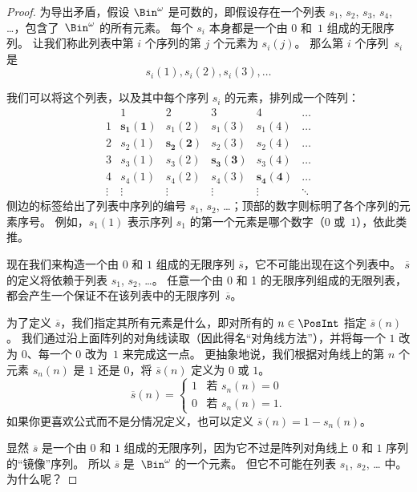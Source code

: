 \documentclass[../../../include/open-logic-section]{subfiles}
\begin{document}
\begin{proof}
为导出矛盾，假设 $\Bin^\omega$ 是可数的，即假设存在一个列表 $s_{1}$, $s_{2}$, $s_{3}$, $s_{4}$, \dots{}，包含了~$\Bin^\omega$ 的所有元素。
每个 $s_i$ 本身都是一个由 $0$ 和~$1$ 组成的无限序列。
让我们称此列表中第 $i$ 个序列的第 $j$ 个元素为 $s_i(j)$。
那么第 $i$ 个序列~$s_i$ 是
\[
s_i(1), s_i(2), s_i(3), \dots
\]

我们可以将这个列表，以及其中每个序列 $s_i$ 的元素，排列成一个阵列：
\[
\begin{array}{c|c|c|c|c|c}
& 1 & 2 & 3 & 4 & \dots \\\hline
1 & \mathbf{s_{1}(1)} & s_{1}(2) & s_{1}(3) & s_1(4) & \dots \\\hline
2 & s_{2}(1)& \mathbf{s_{2}(2)} & s_2(3) & s_2(4) & \dots \\\hline
3 & s_{3}(1)& s_{3}(2) & \mathbf{s_3(3)} & s_3(4) & \dots \\\hline
4 & s_{4}(1)& s_{4}(2) & s_4(3) & \mathbf{s_4(4)} & \dots \\\hline
\vdots & \vdots & \vdots & \vdots & \vdots & \mathbf{\ddots}
\end{array}
\]
侧边的标签给出了列表中序列的编号 $s_1$, $s_2$, \dots；顶部的数字则标明了各个序列的元素序号。
例如，$s_{1}(1)$ 表示序列 $s_{1}$ 的第一个元素是哪个数字（$0$ 或~$1$），依此类推。

现在我们来构造一个由 $0$ 和 $1$ 组成的无限序列 $\overline{s}$，它不可能出现在这个列表中。
$\overline{s}$ 的定义将依赖于列表 $s_1$, $s_2$, \dots。
任意一个由 0 和 1 的无限序列组成的无限列表，都会产生一个保证不在该列表中的无限序列~$\overline{s}$。

为了定义 $\overline{s}$，我们指定其所有元素是什么，即对所有的 $n \in \PosInt$ 指定 $\overline{s}(n)$。
我们通过沿上面阵列的对角线读取（因此得名“对角线方法”），并将每一个 $1$ 改为 $0$、每一个 $0$ 改为~$1$ 来完成这一点。
更抽象地说，我们根据对角线上的第 $n$ 个元素 $s_n(n)$ 是 $1$ 还是 $0$，将 $\overline{s}(n)$ 定义为 $0$ 或 $1$。
\[
\overline{s}(n) =
\begin{cases}
1 & \text{若 $s_{n}(n) = 0$}\\
0 & \text{若 $s_{n}(n) = 1$}.
\end{cases}
\]
如果你更喜欢公式而不是分情况定义，也可以定义 $\overline{s}(n) = 1 - s_n(n)$。

显然 $\overline{s}$ 是一个由 $0$ 和 $1$ 组成的无限序列，因为它不过是阵列对角线上 $0$ 和 $1$ 序列的“镜像”序列。
所以 $\overline{s}$ 是~$\Bin^\omega$ 的一个元素。
但它不可能在列表 $s_1$, $s_2$, \dots{} 中。为什么呢？


\end{proof}
\end{document}
